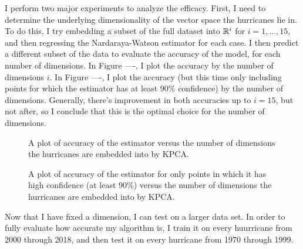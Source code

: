 
\par
I perform two major experiments to analyze the efficacy.
First, I need to determine the underlying dimensionality of the vector space the hurricanes lie in.
To do this, I try embedding a subset of the full dataset into $\mathbb{R}^{i}$ for $i=1,\ldots,15$, and then regressing the Nardaraya-Watson estimator for each case.
I then predict a different subset of the data to evaluate the accuracy of the model, for each number of dimensions.
In Figure ----, I plot the accuracy by the number of dimensions $i$.
In Figure ----, I plot the accuracy (but this time only including points for which the estimator has at least $90\%$ confidence) by the number of dimensions.
Generally, there's improvement in both accuracies up to $i=15$, but not after, so I conclude that this is the optimal choice for the number of dimensions.

\begin{figure}
	\centering
	\caption{A plot of accuracy of the estimator versus the number of dimensions the hurricanes are embedded into by KPCA.}
	\label{fig:dimensions}
\end{figure}

\begin{figure}
	\centering
	\caption{A plot of accuracy of the estimator for only points in which it has high confidence (at least $90\%$) versus the number of dimensions the hurricanes are embedded into by KPCA.}
	\label{fig:confident_dimensions}
\end{figure}

\par
Now that I have fixed a dimension, I can test on a larger data set.
In order to fully evaluate how accurate my algorithm is, I train it on every huurricane from 2000 through 2018, and then test it on every hurricane from 1970 through 1999.